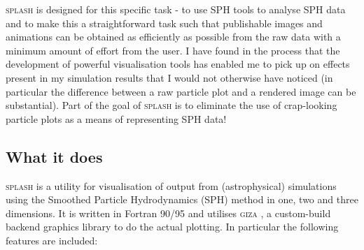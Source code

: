 \documentclass[a4paper,10pt]{article}
\newcommand{\splash}{\textsc{splash }}
\newcommand{\giza}{\textsc{giza }}
\begin{document}
 \splash is designed for this specific task - to use SPH tools to analyse SPH data and to make this a
straightforward task such that publishable images and animations can be obtained
as efficiently as possible from the raw data with a minimum amount of effort
from the user. I have found in the process that the development of powerful
visualisation tools has enabled me to pick up on effects present in my
simulation results that I would not otherwise have noticed (in particular the
difference between a raw particle plot and a rendered image can be substantial). Part of the goal of
\splash is to eliminate the use of crap-looking particle plots as a means of representing SPH data!

\subsection{What it does}
\splash is a utility for visualisation of output from (astrophysical) simulations using the
Smoothed Particle Hydrodynamics (SPH) method in one, two and three dimensions.
It is written in Fortran 90/95 and utilises \giza, a custom-build backend graphics library to do the actual plotting. In particular the following
features are included:
\end{document}
